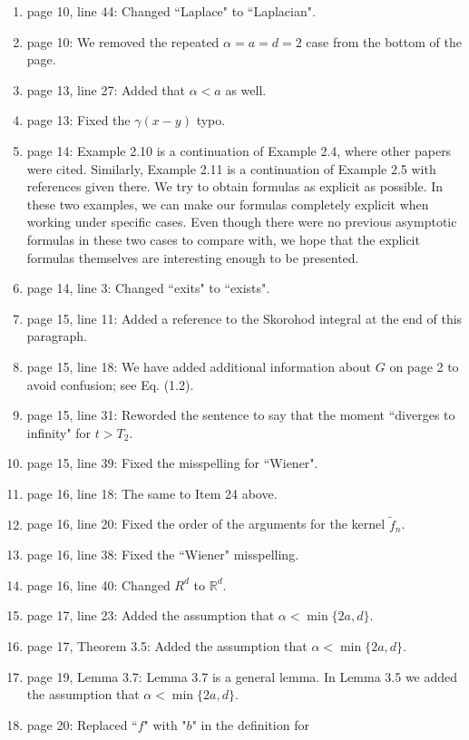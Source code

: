 \documentclass[12pt]{article}%
\theoremstyle{plain}
\theoremstyle{definition}
\def\R{\mathbb{R}}
\numberwithin{equation}{section}
\begin{document}
\begin{enumerate}
  \item[17.] page 10, line 44: Changed ``Laplace" to ``Laplacian".
  \item[18.] page 10: We removed the repeated $\alpha = a = d =2$ case from the
    bottom of the page.
  \item[19.] page 13, line 27: Added that $\alpha<a$ as well.
  \item[20.] page 13: Fixed the $\gamma(x-y)$ typo.
  \item[21.] page 14: Example 2.10 is a continuation of Example 2.4, where
    other papers were cited. Similarly, Example 2.11 is a continuation of
    Example 2.5 with references given there. We try to obtain formulas as
    explicit as possible. In these two examples, we can make our formulas
    completely explicit when working under specific cases. Even though there
    were no previous asymptotic formulas in these two cases to compare with, we
    hope that the explicit formulas themselves are interesting enough to be
    presented.
  \item[22.] page 14, line 3: Changed ``exits" to ``exists".
  \item[23.] page 15, line 11: Added a reference to the Skorohod integral at
    the end of this paragraph.
  \item[24.] page 15, line 18: We have added additional information about $G$
    on page 2 to avoid confusion; see Eq. (1.2).
  \item[25.] page 15, line 31: Reworded the sentence to say that the moment
    ``diverges to infinity" for $t>T_2$.
  \item[26.] page 15, line 39: Fixed the misspelling for ``Wiener".
  \item[27.] page 16, line 18: The same to Item 24 above.
  \item[28.] page 16, line 20: Fixed the order of the arguments for the kernel
    $\tilde{f}_n$.
  \item[29.] page 16, line 38: Fixed the ``Wiener" misspelling.
  \item[30.] page 16, line 40: Changed $R^d$ to $\R^d$.
  \item[31.] page 17, line 23: Added the assumption that $\alpha <
    \min\{2a,d\}$.
  \item[32.] page 17, Theorem 3.5: Added the assumption that $\alpha <
    \min\{2a,d\}$.
  \item[33.] page 19, Lemma 3.7: Lemma 3.7 is a general lemma. In Lemma 3.5 we
    added the assumption that $\alpha < \min\{2a,d\}$.
  \item[34.] page 20: Replaced ``$f$" with "$b$" in the definition for

\end{enumerate}
\end{document}
